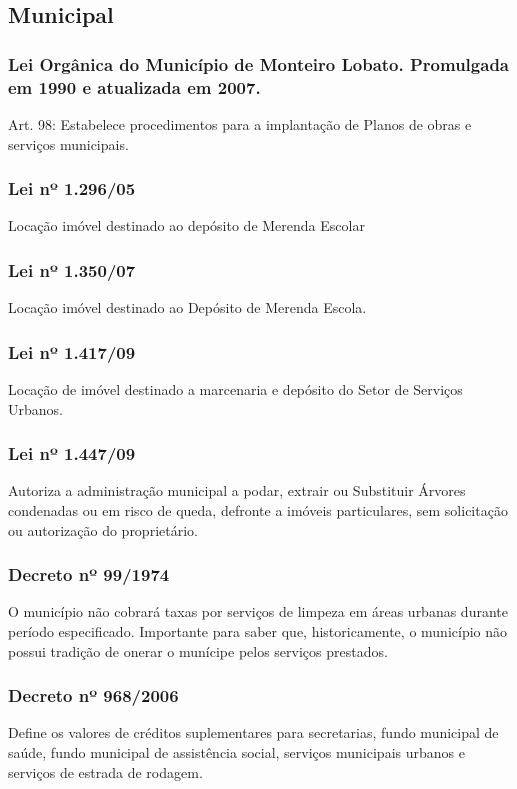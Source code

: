\begin{subapend}
	\subsection{Municipal}
	\begin{subsubapend}
		\item \subsubsection{Lei Orgânica do Município de Monteiro Lobato. Promulgada em 1990 e atualizada em 2007.}
		Art. 98: Estabelece procedimentos para a implantação de Planos de obras e serviços municipais.
		\subsubsection{Lei nº 1.296/05}
		Locação imóvel destinado ao depósito de Merenda Escolar
		\subsubsection{Lei nº 1.350/07}
		Locação imóvel destinado ao Depósito de Merenda Escola. 
		\subsubsection{Lei nº 1.417/09}
		Locação de imóvel destinado a marcenaria e depósito do Setor de Serviços Urbanos.
		\subsubsection{Lei nº 1.447/09}
		Autoriza a administração municipal a podar, extrair ou Substituir Árvores condenadas ou em risco de queda, defronte a imóveis particulares, sem solicitação ou autorização do proprietário.
		\subsubsection{Decreto nº 99/1974}
		O município não cobrará taxas por serviços de limpeza em áreas urbanas durante período especificado. Importante para saber que, historicamente, o município não possui tradição de onerar o munícipe pelos serviços prestados.
		\subsubsection{Decreto nº 968/2006}
		Define os valores de créditos suplementares para secretarias, fundo municipal de saúde, fundo municipal de assistência social, serviços municipais urbanos e serviços de estrada de rodagem.
	\end{subsubapend}
\end{subapend}

